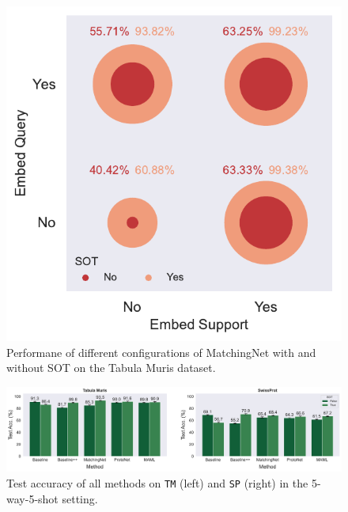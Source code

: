 \begin{figure}[h!]
    \centering
    \includegraphics[width=0.75\columnwidth]{../figures/sot-interaction-scatter.pdf}
    \caption{Performane of different configurations of MatchingNet with and without SOT on the Tabula Muris dataset.}
    \label{fig:sot-interaction-scatter}
\end{figure}

\begin{figure}
    \centering
    \includegraphics[width=0.9\linewidth]{../figures/benchmark-perf.pdf}
    \caption{Test accuracy of all methods on \texttt{TM} (left) and \texttt{SP} (right) in the 5-way-5-shot setting.}
    \label{fig:benchmark-perf}
\end{figure}